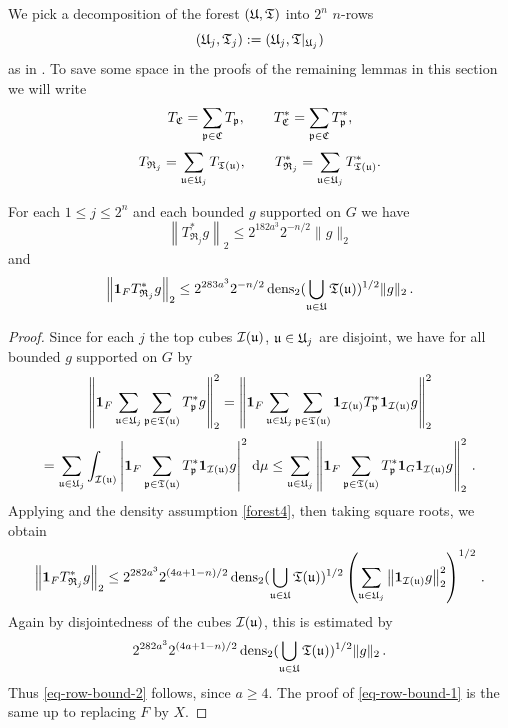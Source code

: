 We pick a decomposition of the forest $({\mathfrak U}, {\mathfrak T})$ into $2^n$ $n$-rows
\begin{equation*}
({\mathfrak U}_j, {\mathfrak T}_j) := ({\mathfrak U}_j, {\mathfrak T}|_{{\mathfrak U}_j})
\end{equation*}
as in . To save some space in the proofs of the remaining lemmas in this section we will write
    $$
        T_{{\mathfrak C}} = \sum_{{\mathfrak p} \in {\mathfrak C}} T_{{\mathfrak p}},\qquad T_{{\mathfrak C}}^* = \sum_{{\mathfrak p} \in {\mathfrak C}} T_{{\mathfrak p}}^*,
    $$
    $$
        T_{\mathfrak{R}_j} = \sum_{{\mathfrak u} \in {\mathfrak U}_j} T_{{\mathfrak T}({\mathfrak u})},\qquad T_{\mathfrak{R}_j}^* = \sum_{{\mathfrak u} \in {\mathfrak U}_j} T_{{\mathfrak T}({\mathfrak u})}^*.
    $$
\begin{lemma}
    \label{row-bound}
    \leanok
    For each $1 \le j \le 2^n$ and each bounded $g$ supported on $G$ we have
    \begin{equation}
        \label{eq-row-bound-1}
        \left\| T_{\mathfrak{R}_j}^*g \right\|_2 \le 2^{182a^3} 2^{-n/2} \|g\|_2
    \end{equation}
    and
    \begin{equation}
        \label{eq-row-bound-2}
        \left\| \mathbf{1}_F T_{\mathfrak{R}_j}^*g \right\|_2 \le 2^{283a^3} 2^{-n/2} \operatorname{\operatorname{dens}}_2(\bigcup_{{\mathfrak u}\in {\mathfrak U}}{\mathfrak T}({\mathfrak u}))^{1/2} \|g\|_2\,.
    \end{equation}
\end{lemma}

\begin{proof}
    \leanok
    Since for each $j$ the top cubes ${\mathcal{I}}({\mathfrak u})$, ${\mathfrak u} \in {\mathfrak U}_j$ are disjoint, we have for all bounded $g$ supported on $G$ by 
    $$
        \left\|\mathbf{1}_F \sum_{{\mathfrak u} \in {\mathfrak U}_j} \sum_{{\mathfrak p} \in {\mathfrak T}({\mathfrak u})} T_{{\mathfrak p}}^* g\right\|_2^2 = \left\|\mathbf{1}_F \sum_{{\mathfrak u} \in {\mathfrak U}_j} \sum_{{\mathfrak p} \in {\mathfrak T}({\mathfrak u})} \mathbf{1}_{{\mathcal{I}}({\mathfrak u})} T_{{\mathfrak p}}^* \mathbf{1}_{{\mathcal{I}}({\mathfrak u})} g\right\|_2^2
    $$
    $$
        = \sum_{{\mathfrak u} \in {\mathfrak U}_j} \int_{{\mathcal{I}}({\mathfrak u})} \left| \mathbf{1}_F \sum_{{\mathfrak p} \in {\mathfrak T}({\mathfrak u})} T_{{\mathfrak p}}^* \mathbf{1}_{{\mathcal{I}}({\mathfrak u})} g\right|^2 \, \mathrm{d}\mu
        \le \sum_{{\mathfrak u} \in {\mathfrak U}_j} \left\|\mathbf{1}_F \sum_{{\mathfrak p} \in {\mathfrak T}({\mathfrak u})} T_{{\mathfrak p}}^* \mathbf{1}_G \mathbf{1}_{{\mathcal{I}}({\mathfrak u})}  g\right\|_2^2\,.
    $$
    Applying  and the density assumption \eqref{forest4}, then taking square roots, we obtain
    $$
        \left\| \mathbf{1}_F T_{\mathfrak{R}_j}^*g \right\|_2 \le 2^{282a^3} 2^{(4a+1-n)/2} \operatorname{\operatorname{dens}}_2(\bigcup_{{\mathfrak u}\in {\mathfrak U}}{\mathfrak T}({\mathfrak u}))^{1/2} \left( \sum_{{\mathfrak u} \in {\mathfrak U}_j} \left\| \mathbf{1}_{{\mathcal{I}}({\mathfrak u})} g\right\|_2^2 \right)^{1/2}\,.
    $$
    Again by disjointedness of the cubes ${\mathcal{I}}({\mathfrak u})$, this is estimated by
    $$
        2^{282a^3} 2^{(4a+1-n)/2} \operatorname{\operatorname{dens}}_2(\bigcup_{{\mathfrak u}\in {\mathfrak U}}{\mathfrak T}({\mathfrak u}))^{1/2} \|g\|_2\,.
    $$
    Thus \eqref{eq-row-bound-2} follows, since $a \ge 4$. The proof of \eqref{eq-row-bound-1} is the same up to replacing $F$ by $X$.
\end{proof}

